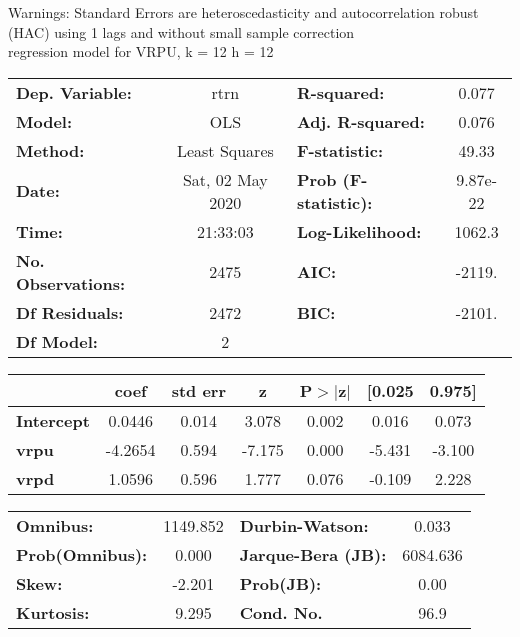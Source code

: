 Warnings: \newline
 [1] Standard Errors are heteroscedasticity and autocorrelation robust (HAC) using 1 lags and without small sample correction\\ 

regression model for VRPU, k = 12 h = 12\begin{center}
\begin{tabular}{lclc}
\toprule
\textbf{Dep. Variable:}    &       rtrn       & \textbf{  R-squared:         } &     0.077   \\
\textbf{Model:}            &       OLS        & \textbf{  Adj. R-squared:    } &     0.076   \\
\textbf{Method:}           &  Least Squares   & \textbf{  F-statistic:       } &     49.33   \\
\textbf{Date:}             & Sat, 02 May 2020 & \textbf{  Prob (F-statistic):} &  9.87e-22   \\
\textbf{Time:}             &     21:33:03     & \textbf{  Log-Likelihood:    } &    1062.3   \\
\textbf{No. Observations:} &        2475      & \textbf{  AIC:               } &    -2119.   \\
\textbf{Df Residuals:}     &        2472      & \textbf{  BIC:               } &    -2101.   \\
\textbf{Df Model:}         &           2      & \textbf{                     } &             \\
\bottomrule
\end{tabular}
\begin{tabular}{lcccccc}
                   & \textbf{coef} & \textbf{std err} & \textbf{z} & \textbf{P$> |$z$|$} & \textbf{[0.025} & \textbf{0.975]}  \\
\midrule
\textbf{Intercept} &       0.0446  &        0.014     &     3.078  &         0.002        &        0.016    &        0.073     \\
\textbf{vrpu}      &      -4.2654  &        0.594     &    -7.175  &         0.000        &       -5.431    &       -3.100     \\
\textbf{vrpd}      &       1.0596  &        0.596     &     1.777  &         0.076        &       -0.109    &        2.228     \\
\bottomrule
\end{tabular}
\begin{tabular}{lclc}
\textbf{Omnibus:}       & 1149.852 & \textbf{  Durbin-Watson:     } &    0.033  \\
\textbf{Prob(Omnibus):} &   0.000  & \textbf{  Jarque-Bera (JB):  } & 6084.636  \\
\textbf{Skew:}          &  -2.201  & \textbf{  Prob(JB):          } &     0.00  \\
\textbf{Kurtosis:}      &   9.295  & \textbf{  Cond. No.          } &     96.9  \\
\bottomrule
\end{tabular}
\end{center}

